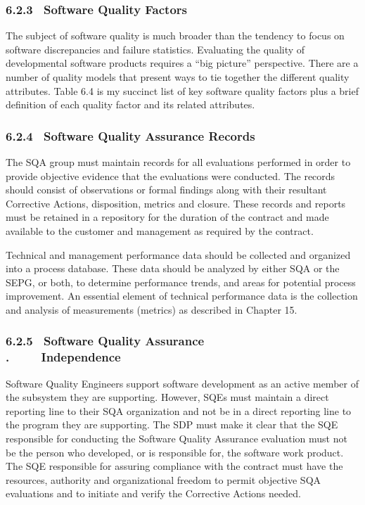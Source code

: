 \documentclass[10pt,twocolumn]{article}
\begin{document}
\subsubsection*{6.2.3 $\,$ Software Quality Factors}
The subject of software quality is much broader than the
tendency to focus on software discrepancies and failure
statistics. Evaluating the quality of developmental software
products requires a “big picture” perspective. There are a
number of quality models that present ways to tie together
the different quality attributes. Table 6.4 is my succinct list
of key software quality factors plus a brief definition of each
quality factor and its related attributes.
\subsubsection*{6.2.4 $\,$ Software Quality Assurance Records}
The SQA group must maintain records for all evaluations
performed in order to provide objective evidence that the
evaluations were conducted. The records should consist of
observations or formal findings along with their resultant
Corrective Actions, disposition, metrics and closure. These
records and reports must be retained in a repository for the
duration of the contract and made available to the customer
and management as required by the contract.

Technical and management performance data should be
collected and organized into a process database. These data
should be analyzed by either SQA or the SEPG, or both, to
determine performance trends, and areas for potential process improvement. An essential element of technical performance data is the collection and analysis of measurements
(metrics) as described in Chapter 15.

\subsubsection*{6.2.5 $\,$ Software Quality Assurance\\{\color{white}.} $\qquad$ Independence}

Software Quality Engineers support software development
as an active member of the subsystem they are supporting.
However, SQEs must maintain a direct reporting line to
their SQA organization and not be in a direct reporting line
to the program they are supporting. The SDP must make it
clear that the SQE responsible for conducting the Software
Quality Assurance evaluation must not be the person who
developed, or is responsible for, the software work product.
The SQE responsible for assuring compliance with the contract must have the resources, authority and organizational
freedom to permit objective SQA evaluations and to initiate
and verify the Corrective Actions needed.
\end{document}

